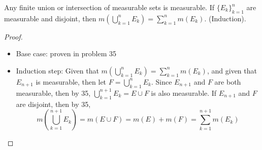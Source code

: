 \begin{pblm}%
	Any finite union or intersection of measurable sets is measurable. 
	If $\{E_k\}_{k=1}^n$ are measurable and disjoint, then 
	$m\left(\bigcup\limits_{k=1}^n E_k\right) = \sum\limits_{k=1}^nm(E_k)$. 
	(Induction).
\begin{proof}

\begin{itemize}
	\item Base case: proven in problem 35

	\item Induction step: Given that $m\left(\bigcup\limits_{k=1}^nE_k\right) = \sum\limits_{k=1}^nm(E_k)$, 
	and given that $E_{n+1}$ is measurable, then let $F = \bigcup\limits_{k=1}^nE_k$. 
	Since $E_{n+1}$ and $F$ are both measurable, then by 35, $\bigcup\limits_{k=1}^{n+1}E_k = E \cup F$ is also measurable. 
	If $E_{n+1}$ and $F$ are disjoint, then by 35, 
	\begin{equation*}
		m\left(\bigcup\limits_{k=1}^{n+1}E_k\right) = 
		m(E \cup F) = m(E) + m(F)
		= \sum\limits_{k=1}^{n+1}m(E_k)
	\end{equation*}
\end{itemize}
\end{proof}
\end{pblm}

